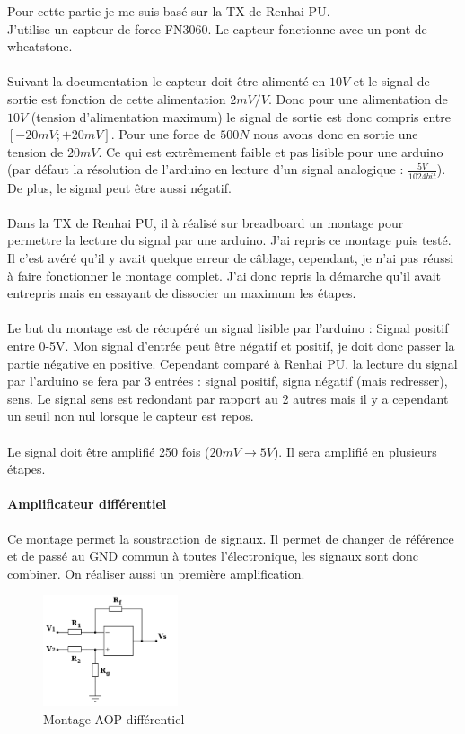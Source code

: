 \documentclass[11pt]{article}
\begin{document}
Pour cette partie je me suis basé sur la TX de Renhai PU.\\
J'utilise un capteur de force FN3060. Le capteur fonctionne avec un pont de wheatstone. \\
\\
Suivant la documentation le capteur doit être alimenté en $10V$ et le signal de sortie est fonction de cette alimentation $2mV/V$. Donc pour une alimentation de $10V$ (tension d'alimentation maximum) le signal de sortie est donc compris entre $ [-20mV ; +20mV] $. Pour une force de $500N$ nous avons donc en sortie une tension de $20mV$. Ce qui est extrêmement faible et pas lisible pour une arduino (par défaut la résolution de l'arduino en lecture d'un signal analogique : $\frac{5V}{1024 bit} $). De plus, le signal peut être aussi négatif.\\
\\
Dans la TX de Renhai PU, il à réalisé sur breadboard un montage pour permettre la lecture du signal par une arduino. J'ai repris ce montage puis testé. Il c'est avéré qu'il y avait quelque erreur de câblage, cependant, je n'ai pas réussi à faire fonctionner le montage complet. J'ai donc repris la démarche qu'il avait entrepris mais en essayant de dissocier un maximum les étapes.\\
\\
Le but du montage est de récupéré un signal lisible par l'arduino : Signal positif entre 0-5V. Mon signal d'entrée peut être négatif et positif, je doit donc passer la partie négative en positive. Cependant comparé à Renhai PU, la lecture du signal par l'arduino se fera par 3 entrées : signal positif, signa négatif (mais redresser), sens. Le signal sens est redondant par rapport au 2 autres mais il y a cependant un seuil non nul lorsque le capteur est repos.\\
\\
Le signal doit être amplifié 250 fois ($20mV \rightarrow 5V$). Il sera amplifié en plusieurs étapes. 

\paragraph{Amplificateur différentiel}
Ce montage permet la soustraction de signaux. Il permet de changer de référence et de passé au GND commun à toutes l'électronique, les signaux sont donc combiner. On réaliser aussi un première amplification.\\

\begin{figure}[!h]
	\centering
	\includegraphics[width=150px]{AOP_dif.png}
	\caption{Montage AOP différentiel}
\end{figure}
\FloatBarrier
\end{document}
